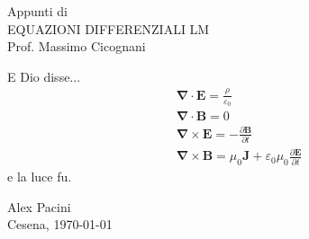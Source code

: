\begin{titlepage}
\begin{center}
\vfill
%
{\LARGE{\sc Appunti di}}\\
\vspace{10mm} 
{\Huge {EQUAZIONI DIFFERENZIALI LM}} \\
\vspace{15mm} 
{\huge {Prof. Massimo Cicognani}}
\end{center}
%
\vspace{20mm}
\LARGE {E Dio disse...}
%
\begin{align*}
& \boldsymbol{\nabla} \cdot \boldsymbol{E} = \frac{\rho}{\varepsilon_0} \\
& \boldsymbol{\nabla} \cdot \boldsymbol{B} = 0 \\
& \boldsymbol{\nabla} \times \boldsymbol{E} = - \frac{\partial \boldsymbol{B}}{\partial t} \\
& \boldsymbol{\nabla} \times \boldsymbol{B} = \mu_0 \boldsymbol{J} + \varepsilon_0 \mu_0 \frac{\partial \boldsymbol{E}}{\partial t}
\end{align*}
%
\LARGE e la luce fu.
%
\vfill
\begin{center}
{\Large {Alex Pacini}}\\
\vspace{5mm}
{\large Cesena, \today}
\end{center}


\end{titlepage}